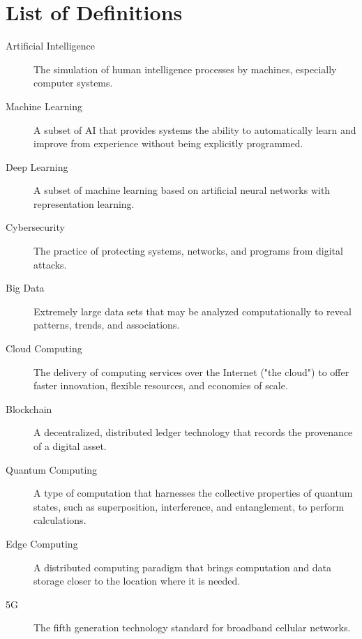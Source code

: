 \cleardoublepage
{}
{}
\chapter*{List of Definitions}
\begin{description}
    \item[Artificial Intelligence] The simulation of human intelligence processes by machines, especially computer systems.
    \item[Machine Learning] A subset of AI that provides systems the ability to automatically learn and improve from experience without being explicitly programmed.
    \item[Deep Learning] A subset of machine learning based on artificial neural networks with representation learning.
    \item[Cybersecurity] The practice of protecting systems, networks, and programs from digital attacks.
    \item[Big Data] Extremely large data sets that may be analyzed computationally to reveal patterns, trends, and associations.
    \item[Cloud Computing] The delivery of computing services over the Internet ("the cloud") to offer faster innovation, flexible resources, and economies of scale.
    \item[Blockchain] A decentralized, distributed ledger technology that records the provenance of a digital asset.
    \item[Quantum Computing] A type of computation that harnesses the collective properties of quantum states, such as superposition, interference, and entanglement, to perform calculations.
    \item[Edge Computing] A distributed computing paradigm that brings computation and data storage closer to the location where it is needed.
    \item[5G] The fifth generation technology standard for broadband cellular networks.
\end{description}

\cleardoublepage